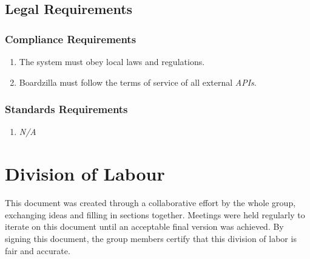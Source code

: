 \documentclass{article}
\begin{document}
	
	\subsection{Legal Requirements}
	\label{sub:legal_requirements}
	
	\subsubsection{Compliance Requirements}
	\label{ssub:compliance_requirements}
	\begin{enumerate}[{LR}1. ]
		\item The system must obey local laws and regulations.
		\item Boardzilla must follow the terms of service of all external \textit{APIs}.
	\end{enumerate}
	
	\subsubsection{Standards Requirements}
	\label{ssub:standards_requirements}
	\begin{enumerate}[{LR}1. ]
		\item \emph{N/A}
	\end{enumerate}
	
	
	\newpage
	\appendix
	\section{Division of Labour}
	\label{sec:division_of_labour}
	This document was created through a collaborative effort by the whole group, exchanging ideas and filling in sections together. Meetings were held regularly to iterate on this document until an acceptable final version was achieved. By signing this document, the group members certify that this division of labor is fair and accurate.
	
\end{document}
